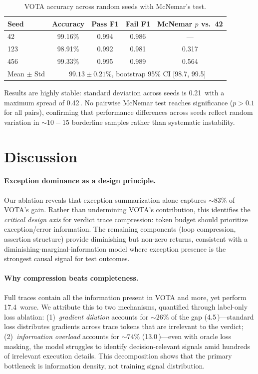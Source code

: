 \documentclass[11pt]{article}
\newcommand{\vota}{\textsc{VOTA}}
\newcommand{\pp}{\,\text{pp}}
\begin{document}
\begin{table}[t]
\centering
\caption{\vota{} accuracy across random seeds with McNemar's test.}
\label{tab:seed}
\small
\begin{tabular}{lcccc}
\toprule
\textbf{Seed} & \textbf{Accuracy} & \textbf{Pass F1} & \textbf{Fail F1} & \textbf{McNemar $p$ vs.\ 42} \\
\midrule
42 & 99.16\% & 0.994 & 0.986 & --- \\
123 & 98.91\% & 0.992 & 0.981 & 0.317 \\
456 & 99.33\% & 0.995 & 0.989 & 0.564 \\
\midrule
Mean $\pm$ Std & \multicolumn{4}{c}{$99.13 \pm 0.21\%$, bootstrap 95\% CI [98.7, 99.5]} \\
\bottomrule
\end{tabular}
\end{table}

Results are highly stable: standard deviation across seeds is 0.21\pp{} with a maximum spread of 0.42\pp{}. No pairwise McNemar test reaches significance ($p > 0.1$ for all pairs), confirming that performance differences across seeds reflect random variation in ${\sim}10{-}15$ borderline samples rather than systematic instability.

\section{Discussion}

\paragraph{Exception dominance as a design principle.}
Our ablation reveals that exception summarization alone captures ${\sim}83\%$ of \vota{}'s gain. Rather than undermining \vota{}'s contribution, this identifies the \emph{critical design axis} for verdict trace compression: token budget should prioritize exception/error information. The remaining components (loop compression, assertion structure) provide diminishing but non-zero returns, consistent with a diminishing-marginal-information model where exception presence is the strongest causal signal for test outcomes.

\paragraph{Why compression beats completeness.}
Full traces contain all the information present in \vota{} and more, yet perform 17.4\pp{} worse. We attribute this to two mechanisms, quantified through label-only loss ablation: (1)~\emph{gradient dilution} accounts for ${\sim}26\%$ of the gap (4.5\pp{})---standard loss distributes gradients across trace tokens that are irrelevant to the verdict; (2)~\emph{information overload} accounts for ${\sim}74\%$ (13.0\pp{})---even with oracle loss masking, the model struggles to identify decision-relevant signals amid hundreds of irrelevant execution details. This decomposition shows that the primary bottleneck is information density, not training signal distribution.
\end{document}
